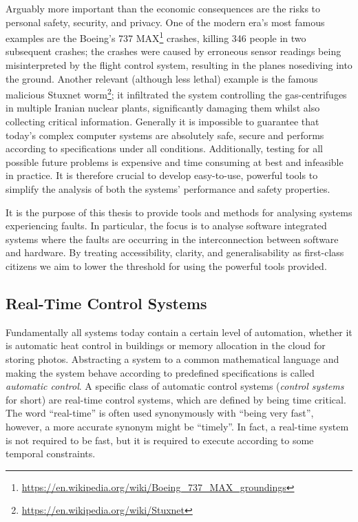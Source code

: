 Arguably more important than the economic consequences are the risks to personal safety, security, and privacy.
One of the modern era's most famous examples are the Boeing's 737 MAX\footnote{\url{https://en.wikipedia.org/wiki/Boeing_737_MAX_groundings}} crashes, killing 346 people in two subsequent crashes; the crashes were caused by erroneous sensor readings being misinterpreted by the flight control system, resulting in the planes nosediving into the ground.
Another relevant (although less lethal) example is the famous malicious Stuxnet worm\footnote{\url{https://en.wikipedia.org/wiki/Stuxnet}}; it infiltrated the system controlling the gas-centrifuges in multiple Iranian nuclear plants, significantly damaging them whilst also collecting critical information. 
Generally it is impossible to guarantee that today's complex computer systems are absolutely safe, secure and performs according to specifications under all conditions.
Additionally, testing for all possible future problems is expensive and time consuming at best and infeasible in practice.
It is therefore crucial to develop easy-to-use, powerful tools to simplify the analysis of both the systems' performance and safety properties.

It is the purpose of this thesis to provide tools and methods for analysing systems experiencing faults.
In particular, the focus is to analyse software integrated systems where the faults are occurring in the interconnection between software and hardware.
By treating accessibility, clarity, and generalisability as first-class citizens we aim to lower the threshold for using the powerful tools provided.




\subsection*{Real-Time Control Systems }%
%
Fundamentally all systems today contain a certain level of automation, whether it is automatic heat control in buildings or memory allocation in the cloud for storing photos.
Abstracting a system to a common mathematical language and making the system behave according to predefined specifications is called \emph{automatic control}.
A specific class of automatic control systems (\emph{control systems} for short) are real-time control systems, which are defined by being time critical.
The word ``real-time'' is often used synonymously with ``being very fast'', however, a more accurate synonym might be ``timely''.
In fact, a real-time system is not required to be fast, but it is required to execute according to some temporal constraints.


